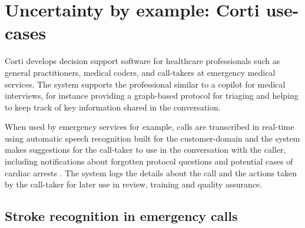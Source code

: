 \section{Uncertainty by example: Corti use-cases}
%
%
Corti develops decision support software for healthcare professionals such as general practitioners, medical coders, and call-takers at emergency medical services. The system supports the professional similar to a copilot for medical interviews, for instance providing a graph-based protocol for triaging and helping to keep track of key information shared in the conversation. 

When used by emergency services for example, calls are transcribed in real-time using automatic speech recognition built for the customer-domain and the system makes suggestions for the call-taker to use in the conversation with the caller, including notifications about forgotten protocol questions \parencite{havtorn_multiqt_2020} and potential cases of cardiac arrests \parencite{cite15, cite14}. The system logs the details about the call and the actions taken by the call-taker for later use in review, training and quality assurance. 



\subsection{Stroke recognition in emergency calls} \label{subsec:motivation-stroke-recognition}
%
